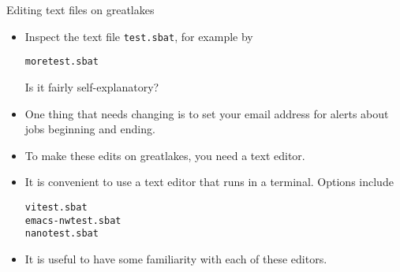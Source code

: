 \begin{frame}[fragile]{Editing text files on greatlakes}

\begin{itemize}
\item Inspect the text file \texttt{test.sbat}, for example by
\begin{knitrout}\small
{}\color{fgcolor}\begin{kframe}
\begin{alltt}
more test.sbat
\end{alltt}
\end{kframe}
\end{knitrout}
Is it fairly self-explanatory?
\item One thing that needs changing is to set your email address for alerts about jobs beginning and ending. 
\item To make these edits on greatlakes, you need a text editor.
\item It is convenient to use a text editor that runs in a terminal. Options include
\begin{knitrout}\small
{}\color{fgcolor}\begin{kframe}
\begin{alltt}
vi test.sbat
emacs -nw test.sbat
nano test.sbat
\end{alltt}
\end{kframe}
\end{knitrout}
\item It is useful to have some familiarity with each of these editors.
\end{itemize}

\end{frame}

